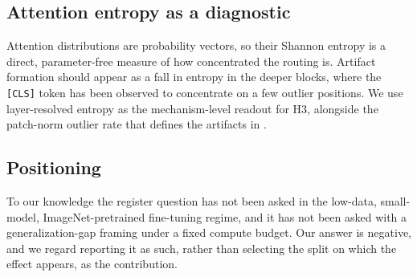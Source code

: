 \subsection{Attention entropy as a diagnostic}

Attention distributions are probability vectors, so their Shannon entropy is a
direct, parameter-free measure of how concentrated the routing is. Artifact
formation should appear as a fall in entropy in the deeper blocks, where the
\texttt{[CLS]} token has been observed to concentrate on a few outlier
positions. We use layer-resolved entropy as the mechanism-level readout for H3,
alongside the patch-norm outlier rate that defines the artifacts in
\cite{darcet2024registers}.

\subsection{Positioning}

To our knowledge the register question has not been asked in the low-data,
small-model, ImageNet-pretrained fine-tuning regime, and it has not been asked
with a generalization-gap framing under a fixed compute budget. Our answer is
negative, and we regard reporting it as such, rather than selecting the split
on which the effect appears, as the contribution.
